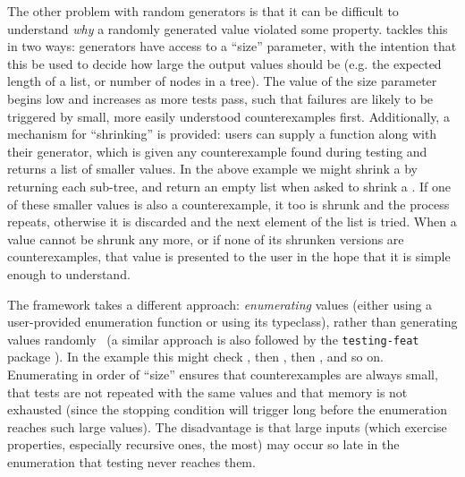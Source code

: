 The other problem with random generators is that it can be difficult to
understand \emph{why} a randomly generated value violated some property.
\quickcheck{} tackles this in two ways: generators have access to a
``size'' parameter, with the intention that this be used to decide how large the
output values should be (e.g. the expected length of a list, or number of nodes
in a tree). The value of the size parameter begins low and increases as more
tests pass, such that failures are likely to be triggered by small, more easily
understood counterexamples first. Additionally, a mechanism for ``shrinking'' is
provided: users can supply a  function along with their generator,
which is given any counterexample found during testing and returns a list of
smaller values. In the above example we might shrink a  by returning
each sub-tree, and return an empty list when asked to shrink a . If one
of these smaller values is also a counterexample, it too is shrunk and the
process repeats, otherwise it is discarded and the next element of the list is
tried. When a value cannot be shrunk any more, or if none of its shrunken
versions are counterexamples, that value is presented to the user in the hope
that it is simple enough to understand.

The \smallcheck{} framework takes a different approach: \emph{enumerating}
values (either using a user-provided enumeration function or using its
 typeclass), rather than generating values
randomly~\cite{runciman2008smallcheck} (a similar approach is also followed by
the \texttt{testing-feat} package \iffalse \cite{}TODO} \fi). In the
 example this might check , then , then , and so on. Enumerating in
order of ``size'' ensures that counterexamples are always small, that tests are
not repeated with the same values and that memory is not exhausted (since the
stopping condition will trigger long before the enumeration reaches such large
values). The disadvantage is that large inputs (which exercise properties,
especially recursive ones, the most) may occur so late in the enumeration that
testing never reaches them.

